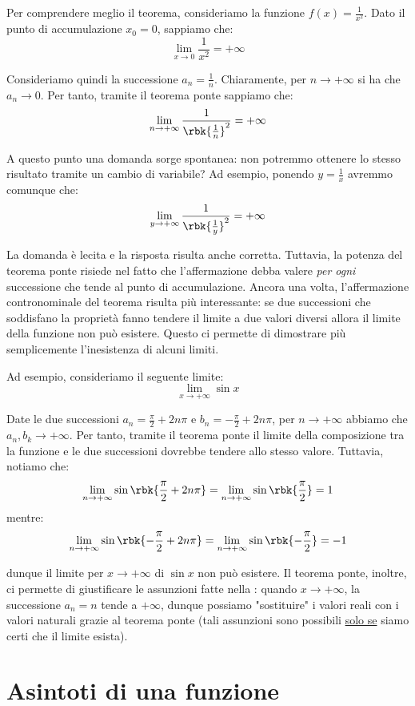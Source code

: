 \documentclass[a4paper, 12pt]{report}
\begin{document}
    Per comprendere meglio il teorema, consideriamo la funzione $f(x) = \frac{1}{x^2}$. Dato il punto di accumulazione $x_0 = 0$, sappiamo che:
    \[\lim_{x \to 0} \frac{1}{x^2} = +\infty\]

    Consideriamo quindi la successione $a_n = \frac{1}{n}$. Chiaramente, per $n \to +\infty$ si ha che $a_n \to 0$. Per tanto, tramite il teorema ponte sappiamo che:
    \[\lim_{n \to +\infty} \frac{1}{\rbk{\frac{1}{n}}^2} = +\infty\]

    A questo punto una domanda sorge spontanea: non potremmo ottenere lo stesso risultato tramite un cambio di variabile? Ad esempio, ponendo $y = \frac{1}{x}$ avremmo comunque che:
    \[\lim_{y \to +\infty} \frac{1}{\rbk{\frac{1}{y}}^2} = +\infty\]

    La domanda è lecita e la risposta risulta anche corretta. Tuttavia, la potenza del teorema ponte risiede nel fatto che l'affermazione debba valere \textit{per ogni} successione che tende al punto di accumulazione. Ancora una volta, l'affermazione contronominale del teorema risulta più interessante: se due successioni che soddisfano la proprietà fanno tendere il limite a due valori diversi allora il limite della funzione non può esistere. Questo ci permette di dimostrare più semplicemente l'inesistenza di alcuni limiti.

    Ad esempio, consideriamo il seguente limite:
    \[\lim_{x \to +\infty} \sin x\]

    Date le due successioni $a_n = \frac{\pi}{2}+2n\pi$ e $b_n = -\frac{\pi}{2} + 2n\pi$, per $n \to +\infty$ abbiamo che $a_n, b_k \to +\infty$. Per tanto, tramite il teorema ponte il limite della composizione tra la funzione e le due successioni dovrebbe tendere allo stesso valore. Tuttavia, notiamo che:
    \[\lim_{n \to +\infty} \sin \rbk{\frac{\pi}{2}+2n\pi} = \lim_{n \to +\infty} \sin \rbk{\frac{\pi}{2}} = 1\]
    mentre:
    \[\lim_{n \to +\infty} \sin \rbk{-\frac{\pi}{2}+2n\pi} = \lim_{n \to +\infty} \sin \rbk{-\frac{\pi}{2}} = -1\]

    dunque il limite per $x \to +\infty$ di $\sin x$ non può esistere. Il teorema ponte, inoltre, ci permette di giustificare le assunzioni fatte nella : quando $x \to +\infty$, la successione $a_n = n$ tende a $+\infty$, dunque possiamo "sostituire" i valori reali con i valori naturali grazie al teorema ponte (tali assunzioni sono possibili \underline{solo se} siamo certi che il limite esista).

    \newpage


    \section{Asintoti di una funzione}
\end{document}
